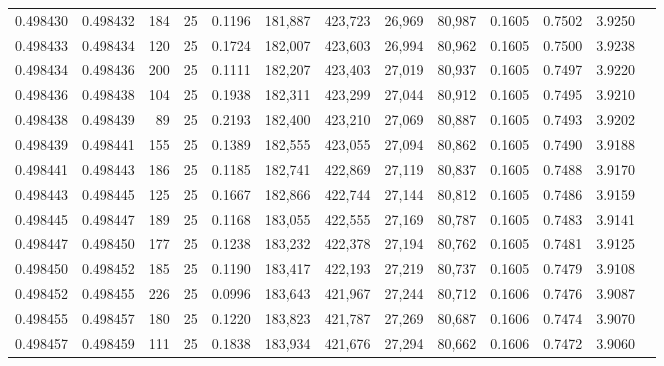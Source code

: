 \begin{tabular}{rrrrrrrrrrrrr}
0.498430 & 0.498432 & 184 &  25 &                                     0.1196 & 181,887 & 423,723 &  26,969 &  80,987 & 0.1605 & 0.7502 & 3.9250 \\
0.498433 & 0.498434 & 120 &  25 &                                     0.1724 & 182,007 & 423,603 &  26,994 &  80,962 & 0.1605 & 0.7500 & 3.9238 \\
0.498434 & 0.498436 & 200 &  25 &                                     0.1111 & 182,207 & 423,403 &  27,019 &  80,937 & 0.1605 & 0.7497 & 3.9220 \\
0.498436 & 0.498438 & 104 &  25 &                                     0.1938 & 182,311 & 423,299 &  27,044 &  80,912 & 0.1605 & 0.7495 & 3.9210 \\
0.498438 & 0.498439 &  89 &  25 &                                     0.2193 & 182,400 & 423,210 &  27,069 &  80,887 & 0.1605 & 0.7493 & 3.9202 \\
0.498439 & 0.498441 & 155 &  25 &                                     0.1389 & 182,555 & 423,055 &  27,094 &  80,862 & 0.1605 & 0.7490 & 3.9188 \\
0.498441 & 0.498443 & 186 &  25 &                                     0.1185 & 182,741 & 422,869 &  27,119 &  80,837 & 0.1605 & 0.7488 & 3.9170 \\
0.498443 & 0.498445 & 125 &  25 &                                     0.1667 & 182,866 & 422,744 &  27,144 &  80,812 & 0.1605 & 0.7486 & 3.9159 \\
0.498445 & 0.498447 & 189 &  25 &                                     0.1168 & 183,055 & 422,555 &  27,169 &  80,787 & 0.1605 & 0.7483 & 3.9141 \\
0.498447 & 0.498450 & 177 &  25 &                                     0.1238 & 183,232 & 422,378 &  27,194 &  80,762 & 0.1605 & 0.7481 & 3.9125 \\
0.498450 & 0.498452 & 185 &  25 &                                     0.1190 & 183,417 & 422,193 &  27,219 &  80,737 & 0.1605 & 0.7479 & 3.9108 \\
0.498452 & 0.498455 & 226 &  25 &                                     0.0996 & 183,643 & 421,967 &  27,244 &  80,712 & 0.1606 & 0.7476 & 3.9087 \\
0.498455 & 0.498457 & 180 &  25 &                                     0.1220 & 183,823 & 421,787 &  27,269 &  80,687 & 0.1606 & 0.7474 & 3.9070 \\
0.498457 & 0.498459 & 111 &  25 &                                     0.1838 & 183,934 & 421,676 &  27,294 &  80,662 & 0.1606 & 0.7472 & 3.9060 \\

\end{tabular}
